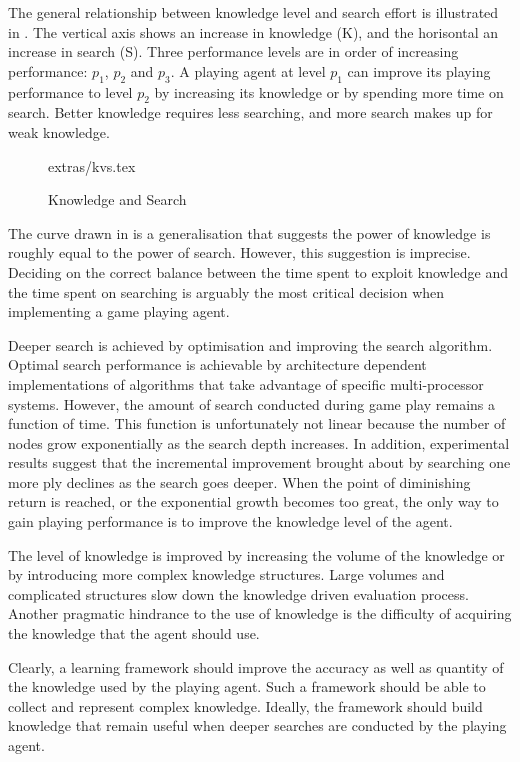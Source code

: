 The general relationship between knowledge level and search effort is illustrated in . The vertical axis shows an increase in knowledge (K), and the horisontal an increase in search (S). Three performance levels are in order of  increasing performance: $p_1$, $p_2$ and $p_3$. A playing agent at level $p_1$ can improve its playing performance to level $p_2$ by increasing its knowledge or by spending more time on search.  Better knowledge requires less searching, and more search makes up for weak knowledge. 

\begin{figure} [!ht]
\center
 {extras/kvs.tex}
\caption{Knowledge and Search}
\label{fig:knowledge}
\end{figure}

The curve drawn in  is a generalisation that suggests the power of knowledge is roughly equal to the power of search.  However, this suggestion is imprecise. Deciding on the correct balance between the time spent to exploit knowledge and the time spent on searching is arguably the most critical decision when implementing a game playing agent.

Deeper search is achieved by optimisation and improving the search algorithm.  Optimal search performance is achievable by architecture dependent implementations of algorithms that take advantage of specific multi-processor systems.  However, the amount of search conducted during game play remains a function of time.  This function is unfortunately not linear because the number of nodes grow exponentially as the search depth increases. In addition, experimental results \cite{schaeffer:reexamination} suggest that the incremental improvement  brought about by searching one more ply declines as the search goes deeper.  When the point of diminishing return is reached, or the exponential growth becomes too great, the only way to gain playing performance is to improve the knowledge level of the agent.

The level of knowledge is improved by increasing the volume of the knowledge or by introducing more complex knowledge structures. Large volumes and complicated structures slow down the knowledge driven evaluation process.  Another pragmatic hindrance to the use of knowledge is the difficulty of acquiring the knowledge that the agent should use.  

Clearly, a learning framework should improve the accuracy as well as quantity of the knowledge used by the playing agent.  Such a framework should be able to collect and represent complex knowledge.  Ideally, the framework should build knowledge that remain useful when deeper searches are conducted by the playing agent.  

